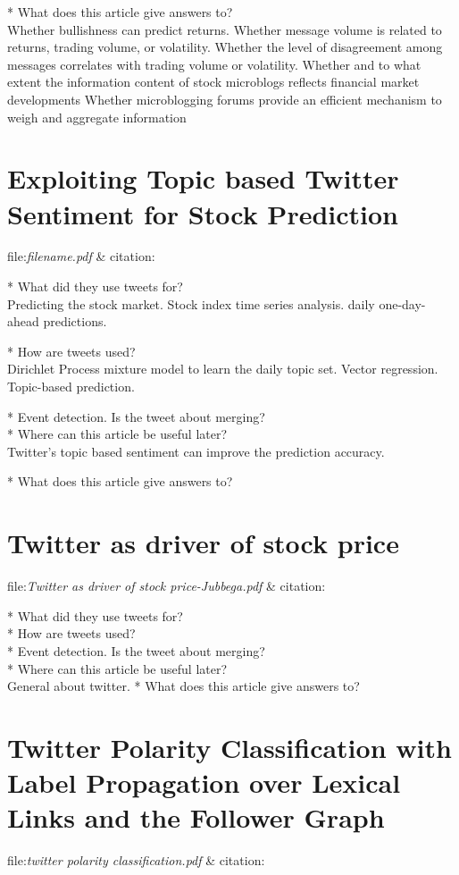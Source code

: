 * What does this article give answers to?\\
Whether bullishness can predict returns.
Whether message volume is related to returns, trading volume, or volatility.
Whether the level of disagreement among messages correlates with trading volume
or volatility.
Whether and to what extent the information content of stock microblogs reflects financial market developments
Whether microblogging forums provide an efficient mechanism to weigh and aggregate information


\section{Exploiting Topic based Twitter Sentiment for Stock Prediction}
file:\textit{filename.pdf} & citation:\cite[]{mukherjee13}  

* What did they use tweets for?\\
Predicting the stock market. 
Stock index time series analysis. 
daily one-day-ahead predictions. 

* How are tweets used?\\
Dirichlet Process mixture model to learn the daily topic set.
Vector regression. 
Topic-based prediction. 

* Event detection. Is the tweet about merging? \\
* Where can this article be useful later? \\
Twitter’s topic based sentiment can improve the prediction accuracy.
\cite[p28]{mukherjee13}

* What does this article give answers to?\\

\section{Twitter as driver of stock price}
file:\textit{Twitter as driver of stock price-Jubbega.pdf} &
citation:\cite[]{annikajubbega11:twitter_driver_stock_price}

* What did they use tweets for?\\
* How are tweets used?\\
* Event detection. Is the tweet about merging? \\
* Where can this article be useful later? \\
General about twitter. 
* What does this article give answers to?\\

\section{Twitter Polarity Classification with Label Propagation over Lexical Links and the Follower Graph}
file:\textit{twitter polarity classification.pdf} & citation:\cite[]{sperious11}

